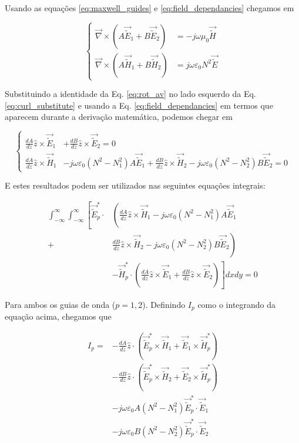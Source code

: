 \documentclass[11pt]{article} %
\newcommand{\diverg}{\vec{\nabla}}
\newcommand{\tildee}{ \vec{\tilde{E}}}
\newcommand{\tildeh}{ \vec{\tilde{H}}}
\newcommand{\epsz}{\varepsilon_0}
\newcommand{\muz}{\mu_0}
\begin{document}
Usando as equações \ref{eq:maxwell_guides} e \ref{eq:field_dependancies} chegamos em

\begin{equation}\label{eq:curl_substitute}
\left\{
\begin{split}
\diverg\times \left( A\tildee_1 + B\tildee_2 \right) &= -j\omega\muz\tildeh \\
\diverg\times \left( A\tildeh_1 + B\tildeh_2 \right) &= j\omega\epsz N^2\tildee
\end{split}
\right.
\end{equation}

Substituindo a identidade da Eq. \ref{eq:rot_av} no lado esquerdo da Eq. \ref{eq:curl_substitute} e usando a Eq. \ref{eq:field_dependancies} em termos que aparecem durante a derivação matemática, podemos chegar em

\begin{equation}\label{eq:AB_dependancies}
\left\{
\begin{split}
\frac{dA}{dz}\hat{z}\times\tildee_1 &+ \frac{dB}{dz}\hat{z}\times\tildee_2 = 0 \\
\frac{dA}{dz}\hat{z}\times\tildeh_1 &-j\omega\epsz\left(N^2-N_1^2\right)A\tildee_1 + \frac{dB}{dz}\hat{z}\times\tildeh_2 -j\omega\epsz\left(N^2-N_2^2\right)B\tildee_2 = 0
\end{split}\right.
\end{equation}

E estes resultados podem ser utilizados nas seguintes equações integrais:

\begin{equation}\label{eq:integral_equations}
\begin{split}
 \int_{-\infty}^\infty \int_{-\infty}^\infty \left[ \tildee_p^*\cdot\right.&\left(\frac{dA}{dz}\hat{z}\times\tildeh_1 - j\omega\epsz\left(N^2-N_1^2\right)A\tildee_1 \right. \\
+ &\left. \frac{dB}{dz}\hat{z}\times\tildeh_2 -j\omega\epsz\left(N^2-N_2^2\right)B\tildee_2\right) \\
 &\left. - \tildeh_p^*\cdot\left( \frac{dA}{dz}\hat{z}\times\tildee_1 + \frac{dB}{dz}\hat{z}\times\tildee_2\right) \right] dxdy = 0
\end{split}
\end{equation}

Para ambos os guias de onda ($p=1,2$). Definindo $I_p$ como o integrando da equação acima, chegamos que

\begin{equation}\label{eq:I_p}
\begin{split}
I_p = &- \frac{dA}{dz}\hat{z}\cdot\left( \tildee_p^*\times\tildeh_1 + \tildee_1\times\tildeh_p^*\right) \\
& - \frac{dB}{dz}\hat{z}\cdot\left( \tildee_p^*\times\tildeh_2 + \tildee_2\times\tildeh_p^*\right) \\
& - j\omega\epsz A\left(N^2-N_1^2\right)\tildee_p^*\cdot\tildee_1 \\
& - j\omega\epsz B\left(N^2-N_2^2\right)\tildee_p^*\cdot\tildee_2
\end{split}
\end{equation}
\end{document}
